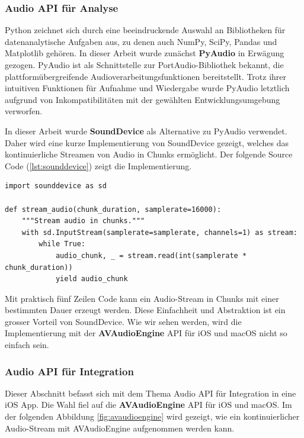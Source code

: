 \documentclass[11pt,a4paper]{article}
\begin{document}
\subsubsection{Audio API für Analyse}
Python zeichnet sich durch eine beeindruckende Auswahl an Bibliotheken für datenanalytische Aufgaben
aus, zu denen auch NumPy, SciPy, Pandas und Matplotlib gehören. In dieser Arbeit wurde zunächst
\textbf{PyAudio} in Erwägung gezogen. PyAudio ist als Schnittstelle zur PortAudio-Bibliothek
bekannt, die plattformübergreifende Audioverarbeitungsfunktionen bereitstellt. Trotz ihrer
intuitiven Funktionen für Aufnahme und Wiedergabe wurde PyAudio letztlich aufgrund von
Inkompatibilitäten mit der gewählten Entwicklungsumgebung verworfen.


\noindent \newline
In dieser Arbeit wurde \textbf{SoundDevice} als Alternative zu PyAudio verwendet. Daher wird eine 
kurze Implementierung von SoundDevice gezeigt, welches das kontinuierliche Streamen von Audio in
Chunks ermöglicht. Der folgende Source Code (\ref{lst:sounddevice}) zeigt die Implementierung.

\begin{lstlisting}[caption={SoundDevice Audio Stream}, label={lst:sounddevice}]
import sounddevice as sd

def stream_audio(chunk_duration, samplerate=16000):
    """Stream audio in chunks."""
    with sd.InputStream(samplerate=samplerate, channels=1) as stream:
        while True:
            audio_chunk, _ = stream.read(int(samplerate * chunk_duration))
            yield audio_chunk
\end{lstlisting}

\noindent
Mit praktisch fünf Zeilen Code kann ein Audio-Stream in Chunks mit einer bestimmten Dauer
erzeugt werden. Diese Einfachheit und Abstraktion ist ein grosser Vorteil von SoundDevice. Wie wir 
sehen werden, wird die Implementierung mit der \textbf{AVAudioEngine} API für iOS und macOS nicht
so einfach sein.


\newpage
\subsubsection{Audio API für Integration} \label{sec:audio_api_integration}
Dieser Abschnitt befasst sich mit dem Thema Audio API für Integration in eine iOS App. Die Wahl 
fiel auf die \textbf{AVAudioEngine} API für iOS und macOS. Im der folgenden Abbildung 
\ref{fig:avaudioengine} wird gezeigt, wie ein kontinuierlicher Audio-Stream mit AVAudioEngine 
aufgenommen werden kann.
\end{document}
